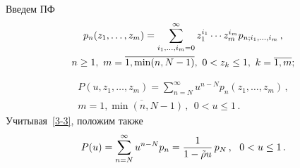 \begin{multicols}{2}
Введем ПФ
\begin{multline*}
p_{n}(z_1,\ldots,z_m) = \sum\limits_{i_1,\dots , i_m=0}^{\infty}
z_1^{i_1} \cdots z_m^{i_m} p_{n;i_1,\ldots,i_m}\,,\\ 
n\ge1, \  m=\overline{1,\min(n,N-1)},  \  0<z_k \le 1, \  k=\overline{1,m};
\end{multline*}

\vspace*{-24pt}

\noindent
\begin{multline*}
P(u,z_1,\ldots,z_m) = \sum\limits_{n=N}^{\infty} u^{n-N} p_{n}(z_1,\ldots,z_m)\,, \\ 
m=\overline{1,\min(n,N-1)}\,,  \ \ 0< u \le 1\,.
\end{multline*}
Учитывая~\eqref{3-3}, положим также
$$ 
P(u) = \sum\limits_{n=N}^{\infty} u^{n-N} p_{n} =
\displaystyle\frac{\displaystyle 1\mathstrut}{\displaystyle 1 - \tilde{\rho} u\mathstrut}\, p_N \,, \ \ 0< u \le 1\,.
$$


\end{multicols}
